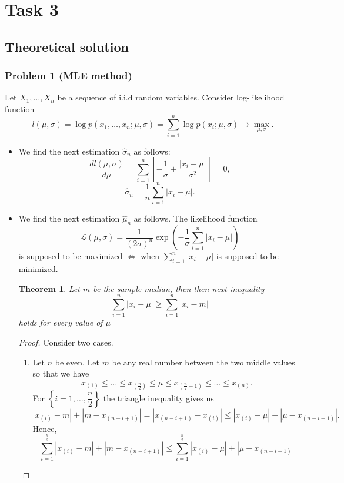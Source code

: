 \documentclass[a4paper, 12pt]{article}
\newtheorem{theorem}{Theorem}
\begin{document}
\section{Task 3}
\subsection{Theoretical solution}
\subsubsection{Problem 1 (MLE method)}
Let $X_1, \ldots, X_n$ be a sequence of i.i.d random variables.
Consider log-likelihood function 
$$
l(\mu, \sigma) = \log p(x_1, \ldots, x_n; \mu, \sigma) = \sum \limits_{i=1}^n \log p(x_i; \mu, \sigma) \rightarrow \max \limits_{\mu, \sigma}.
$$
\begin{itemize}
	\item We find the next estimation $\hat{\sigma}_n$ as follows:
$$
\dfrac{dl(\mu, \sigma)}{d \mu} = \sum \limits_{i=1}^n \left[ - \dfrac{1}{\sigma} + \dfrac{|x_i - \mu|}{\sigma^2} \right] = 0,
$$
$$
\hat{\sigma}_n = \dfrac{1}{n} \sum \limits_{i=1}^n |x_i - \mu|.
$$
	\item We find the next estimation $\hat{\mu}_n$ as follows. The likelihood function 
$$
\mathcal{L}(\mu, \sigma) = \dfrac{1}{(2 \sigma)^n} \exp \left(- \dfrac{1}{\sigma} \sum \limits_{i=1}^n |x_i - \mu| \right)
$$
is supposed to be maximized $\Leftrightarrow$ when $ \sum \limits_{i=1}^n |x_i - \mu|$ is supposed to be minimized.
\begin{theorem}
Let $m$ be the sample median, then then next inequality 
$$
 \sum \limits_{i=1}^n |x_i - \mu| \geqslant  \sum \limits_{i=1}^n |x_i - m|
$$
holds for every value of $\mu$
\end{theorem}
\begin{proof}
Consider  two cases.
\begin{enumerate}
	\item Let $n$ be even. Let $m$ be any real number between the two middle values so that we have
$$
x_{(1)} \leqslant \ldots \leqslant x_{(\frac{n}{2})} \leqslant \mu \leqslant x_{(\frac{n}{2} + 1)} \leqslant \ldots \leqslant x_{(n)}.
$$
For $\left \{i = 1, \ldots, \dfrac{n}{2} \right \}$ the triangle inequality gives us
$$
|x_{(i)} - m| + |m - x_{(n - i + 1)}| = |x_{(n - i + 1)} - x_{(i)}|  \leqslant |x_{(i)} - \mu| + |\mu - x_{(n - i + 1)}|.
$$
Hence,
$$
\sum \limits_{i=1}^{\frac{n}{2}} |x_{(i)} - m| + |m - x_{(n - i + 1)}| \leqslant \sum \limits_{i=1}^{\frac{n}{2}} |x_{(i)} - \mu| + |\mu - x_{(n - i + 1)}|
$$
\end{enumerate}
\end{proof}
\end{itemize}
\end{document}
